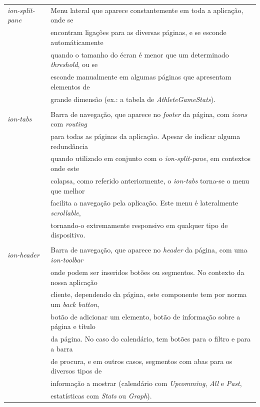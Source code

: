 \begin{tabular}{ll}
	\textit{ion-split-pane} & Menu lateral que aparece constantemente em toda a aplicação, onde se \\
	& encontram ligações para as diversas páginas, e se esconde automáticamente \\
	& quando o tamanho do écran é menor que um determinado \textit{threshold}, ou se \\
	& esconde manualmente em algumas páginas que apresentam elementos de \\
	&grande dimensão (ex.: a tabela de \textit{AthleteGameStats}).\\
	\\
	\textit{ion-tabs} & Barra de navegação, que aparece no \textit{footer} da página, com \textit{icons} com \textit{routing} \\
	&para todas as páginas da aplicação. Apesar de indicar alguma redundância \\
	& quando utilizado em conjunto com o \textit{ion-split-pane}, em contextos onde este \\
	&colapsa, como referido anteriormente, o \textit{ion-tabs} torna-se o menu que melhor \\
	&facilita a navegação pela aplicação. Este menu é lateralmente \textit{scrollable}, \\
	&tornando-o extremamente responsivo em qualquer tipo de dispositivo.\\
	\\
	\textit{ion-header} & Barra de navegação, que aparece no \textit{header} da página, com uma \textit{ion-toolbar} \\
	&onde podem ser inseridos botões ou segmentos. No contexto da nossa aplicação \\
	&cliente, dependendo da página, este componente tem por norma um \textit{back button}, \\
	&botão de adicionar um elemento, botão de informação sobre a página e título \\
	&da página. No caso do calendário, tem botões para o filtro e para a barra \\
	&de procura, e em outros casos, segmentos com abas para os diversos tipos de \\
	&informação a mostrar (calendário com \textit{Upcomming}, \textit{All} e \textit{Past}, \\
	&estatísticas com \textit{Stats} ou \textit{Graph}).\\
\end{tabular}

